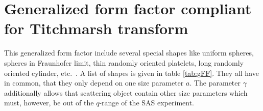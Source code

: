 \clearpage
\section{Generalized form factor compliant for Titchmarsh transform }
\label{sect:TitchmarshObjects}
This generalized form factor include several special shapes like uniform spheres, spheres in Fraunhofer limit, thin randomly oriented platelets, long randomly oriented cylinder, etc.\ \cite{Fedorova1978}. A list of shapes is given in table \ref{tab:gFF}. They all have in common, that they only depend on one size parameter $a$. The parameter $\gamma$ additionally allows that scattering object contain other size parameters which must, however, be out of the $q$-range of the SAS experiment.

